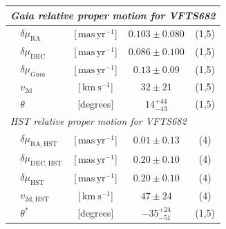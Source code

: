\documentclass[apjl,twocolumn]{emulateapj}
\newcommand{\SdM}[1]{{{\color{brown}{#1}}}}
\newcommand{\kms}{{\,\mathrm{km\ s^{-1}}}}
\newcommand{\masyr}{\,\mathrm{mas}\,\mathrm{yr}^{-1}}
\begin{document}
\begin{table}
\begin{center}
\begin{tabular}{llc|c|c}
                


      \multicolumn{5}{l}{\emph{Gaia relative proper motion for VFTS682 }} \\
      \hline
      &$\delta\mu_\mathrm{RA}$  &[$\masyr$] & $0.103\pm0.080$ & (1,5) \\
      &$\delta\mu_\mathrm{DEC}$  &[$\masyr$] & $0.086\pm0.100$ &  (1,5) \\
      &$\delta\mu_{Gaia}$  &[$\masyr$] & $0.13\pm0.09$ &  (1,5) \\
      &$v_\mathrm{2d}$  &[$\kms$] & $32\pm21$ & (1,5)\\  
      &$\theta$  &[degrees] &  $14_{-43}^{+44}$  & (1,5)\\  

 \hline     
      \multicolumn{5}{l}{\emph{HST relative proper motion for VFTS682}} \\
            \hline
      &$\delta\mu_\mathrm{RA, HST}$  &[$\masyr$] & $0.01\pm0.13$ & (4) \\
      &$\delta\mu_\mathrm{DEC, HST}$  &[$\masyr$] & $0.20\pm0.10$ &  (4) \\
       &$\delta\mu_\mathrm{HST}$  &[$\masyr$] & $0.20\pm0.10$ &  (4) \\
                  &$v_\mathrm{2d, HST}$  &[$\kms$] & $47\pm24$ & (4)\\  
                      &$\theta^{*}$  &[degrees] &   $-35_{-51}^{+24}$   & (1,5)\\  

     
\hline



\end{tabular}
\end{center}
\end{table}
\end{document}
